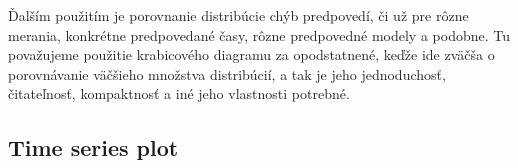 Ďalším použitím je porovnanie distribúcie chýb predpovedí, či už pre rôzne merania, konkrétne predpovedané časy, rôzne predpovedné modely a podobne. Tu považujeme použitie krabicového diagramu za opodstatnené, keďže ide zväčša o porovnávanie väčšieho množstva distribúcií, a tak je jeho jednoduchosť, čitateľnosť, kompaktnosť a iné jeho vlastnosti potrebné.

\subsection{Time series plot}